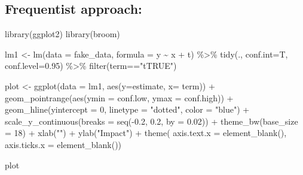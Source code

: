 \documentclass[
  letterpaper,
  DIV=11,
  numbers=noendperiod]{scrreprt}
\newenvironment{Shaded}{\begin{snugshade}}{\end{snugshade}}
\newcommand{\AttributeTok}[1]{\textcolor[rgb]{0.40,0.45,0.13}{#1}}
\newcommand{\DecValTok}[1]{\textcolor[rgb]{0.68,0.00,0.00}{#1}}
\newcommand{\FloatTok}[1]{\textcolor[rgb]{0.68,0.00,0.00}{#1}}
\newcommand{\FunctionTok}[1]{\textcolor[rgb]{0.28,0.35,0.67}{#1}}
\newcommand{\NormalTok}[1]{\textcolor[rgb]{0.00,0.23,0.31}{#1}}
\newcommand{\OtherTok}[1]{\textcolor[rgb]{0.00,0.23,0.31}{#1}}
\newcommand{\SpecialCharTok}[1]{\textcolor[rgb]{0.37,0.37,0.37}{#1}}
\newcommand{\StringTok}[1]{\textcolor[rgb]{0.13,0.47,0.30}{#1}}
\begin{document}
\subsection{Frequentist approach:}\label{frequentist-approach}

\begin{Shaded}
\begin{Highlighting}[]
\FunctionTok{library}\NormalTok{(ggplot2)}
\FunctionTok{library}\NormalTok{(broom)}

\NormalTok{lm1 }\OtherTok{\textless{}{-}} \FunctionTok{lm}\NormalTok{(}\AttributeTok{data =}\NormalTok{ fake\_data, }\AttributeTok{formula =}\NormalTok{ y }\SpecialCharTok{\textasciitilde{}}\NormalTok{ x }\SpecialCharTok{+}\NormalTok{ t) }\SpecialCharTok{\%\textgreater{}\%} 
  \FunctionTok{tidy}\NormalTok{(., }\AttributeTok{conf.int=}\NormalTok{T, }\AttributeTok{conf.level=}\FloatTok{0.95}\NormalTok{) }\SpecialCharTok{\%\textgreater{}\%} 
  \FunctionTok{filter}\NormalTok{(term}\SpecialCharTok{==}\StringTok{"tTRUE"}\NormalTok{) }

\NormalTok{plot }\OtherTok{\textless{}{-}} \FunctionTok{ggplot}\NormalTok{(}\AttributeTok{data =}\NormalTok{ lm1, }\FunctionTok{aes}\NormalTok{(}\AttributeTok{y=}\NormalTok{estimate, }\AttributeTok{x=}\NormalTok{ term)) }\SpecialCharTok{+}
  \FunctionTok{geom\_pointrange}\NormalTok{(}\FunctionTok{aes}\NormalTok{(}\AttributeTok{ymin =}\NormalTok{ conf.low, }\AttributeTok{ymax =}\NormalTok{ conf.high)) }\SpecialCharTok{+}
  \FunctionTok{geom\_hline}\NormalTok{(}\AttributeTok{yintercept =} \DecValTok{0}\NormalTok{, }\AttributeTok{linetype =} \StringTok{"dotted"}\NormalTok{, }\AttributeTok{color =} \StringTok{"blue"}\NormalTok{) }\SpecialCharTok{+} 
  \FunctionTok{scale\_y\_continuous}\NormalTok{(}\AttributeTok{breaks =} \FunctionTok{seq}\NormalTok{(}\SpecialCharTok{{-}}\FloatTok{0.2}\NormalTok{, }\FloatTok{0.2}\NormalTok{, }\AttributeTok{by =} \FloatTok{0.02}\NormalTok{)) }\SpecialCharTok{+}
  \FunctionTok{theme\_bw}\NormalTok{(}\AttributeTok{base\_size =} \DecValTok{18}\NormalTok{) }\SpecialCharTok{+}
  \FunctionTok{xlab}\NormalTok{(}\StringTok{""}\NormalTok{) }\SpecialCharTok{+} 
  \FunctionTok{ylab}\NormalTok{(}\StringTok{"Impact"}\NormalTok{) }\SpecialCharTok{+} 
  \FunctionTok{theme}\NormalTok{(}
  \AttributeTok{axis.text.x =} \FunctionTok{element\_blank}\NormalTok{(),}
  \AttributeTok{axis.ticks.x =} \FunctionTok{element\_blank}\NormalTok{())}

\NormalTok{plot}
\end{Highlighting}
\end{Shaded}
\end{document}

